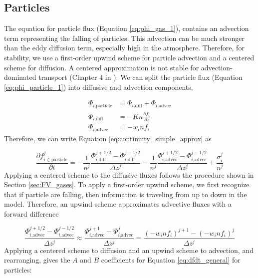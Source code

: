 \subsection{Particles} \label{sec:FV_particles}

The equation for particle flux (Equation \eqref{eq:phi_gas_1}), contains an advection term representing the falling of particles. This advection can be much stronger than the eddy diffusion term, especially high in the atmosphere. Therefore, for stability, we use a first-order upwind scheme for particle advection and a centered scheme for diffusion. A centered approximation is not stable for advection-dominated transport (Chapter 4 in \citet{Leveque_2002}). We can split the particle flux (Equation \eqref{eq:phi_particle_1}) into diffusive and advection components,

\begin{align*}
  \Phi_{i\text{,particle}} &= \Phi_{i\text{,diff}} + \Phi_{i\text{,advec}} \\
  \Phi_{i\text{,diff}} &= - Kn\frac{\partial f_{i}}{\partial z} \\
  \Phi_{i\text{,advec}} &= - w_i n f_{i}
\end{align*}
Therefore, we can write Equation \eqref{eq:continuity_simple_approx} as

\begin{equation}
  \frac{\partial f_{i\in\text{particle}}^j}{\partial t} = - \frac{1}{n^{j}} \frac{\Phi_{i\text{,diff}}^{j+1/2} - \Phi_{i\text{,diff}}^{j-1/2}}{\Delta z^j} - \frac{1}{n^{j}} \frac{\Phi_{i\text{,advec}}^{j+1/2} - \Phi_{i\text{,advec}}^{j-1/2}}{\Delta z^j} + \frac{\sigma_i^j}{n^{j}}
\end{equation}
Applying a centered scheme to the diffusive fluxes follows the procedure shown in Section \ref{sec:FV_gases}. To apply a first-order upwind scheme, we first recognize that if particle are falling, then information is traveling from up to down in the model. Therefore, an upwind scheme approximates advective fluxes with a forward difference

\begin{equation}
  \frac{\Phi_{i\text{,advec}}^{j+1/2} - \Phi_{i\text{,advec}}^{j-1/2}}{\Delta z^j} \approx \frac{\Phi_{i\text{,advec}}^{j+1} - \Phi_{i\text{,advec}}^{j}}{\Delta z^j} = \frac{(-w_i n f_i)^{j+1} - (-w_i n f_i)^{j}}{\Delta z^j}
\end{equation}
Applying a centered scheme to diffusion and an upwind scheme to advection, and rearranging, gives the $A$ and $B$ coefficients for Equation \eqref{eq:dfdt_general} for particles:

